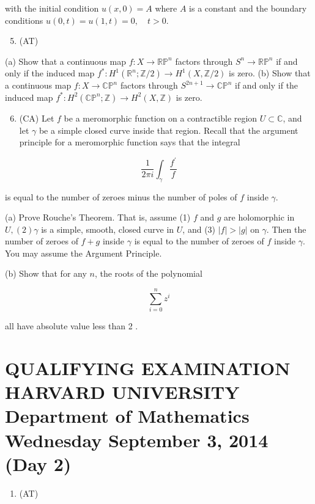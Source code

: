 \documentclass[10pt]{article}
\begin{document}
with the initial condition $u(x, 0)=A$ where $A$ is a constant and the boundary conditions $u(0, t)=u(1, t)=0, \quad t>0$.

\begin{enumerate}
  \setcounter{enumi}{4}
  \item (AT)
\end{enumerate}

(a) Show that a continuous map $f: X \rightarrow \mathbb{R P}^{n}$ factors through $S^{n} \rightarrow \mathbb{R} \mathbb{P}^{n}$ if and only if the induced map $f^{*}: H^{1}\left(\mathbb{R}^{n} ; \mathbb{Z} / 2\right) \rightarrow H^{1}(X, \mathbb{Z} / 2)$ is zero.
(b) Show that a continuous map $f: X \rightarrow \mathbb{C P}^{n}$ factors through $S^{2 n+1} \rightarrow \mathbb{C P}^{n}$ if and only if the induced map $f^{*}: H^{2}\left(\mathbb{C P}^{n} ; \mathbb{Z}\right) \rightarrow H^{2}(X, \mathbb{Z})$ is zero.

\begin{enumerate}
  \setcounter{enumi}{5}
  \item (CA) Let $f$ be a meromorphic function on a contractible region $U \subset \mathbb{C}$, and let $\gamma$ be a simple closed curve inside that region. Recall that the argument principle for a meromorphic function says that the integral
\end{enumerate}

$$
\frac{1}{2 \pi i} \int_{\gamma} \frac{f^{\prime}}{f}
$$

is equal to the number of zeroes minus the number of poles of $f$ inside $\gamma$.

(a) Prove Rouche's Theorem. That is, assume (1) $f$ and $g$ are holomorphic in $U,(2) \gamma$ is a simple, smooth, closed curve in $U$, and (3) $|f|>|g|$ on $\gamma$. Then the number of zeroes of $f+g$ inside $\gamma$ is equal to the number of zeroes of $f$ inside $\gamma$. You may assume the Argument Principle.

(b) Show that for any $n$, the roots of the polynomial

$$
\sum_{i=0}^{n} z^{i}
$$

all have absolute value less than 2 .

\section{QUALIFYING EXAMINATION 
 HARVARD UNIVERSITY 
 Department of Mathematics 
 Wednesday September 3, 2014 (Day 2)}
\begin{enumerate}
  \item (AT)
\end{enumerate}
\end{document}
